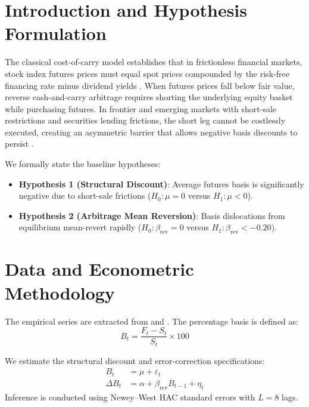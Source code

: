 \documentclass{article}
\begin{document}
\section{Introduction and Hypothesis Formulation}
\label{sec:intro}

The classical cost-of-carry model establishes that in frictionless financial markets, stock index futures prices must equal spot prices compounded by the risk-free financing rate minus dividend yields \citep{brenner1989behavior, chan1992further}. When futures prices fall below fair value, reverse cash-and-carry arbitrage requires shorting the underlying equity basket while purchasing futures. In frontier and emerging markets with short-sale restrictions and securities lending frictions, the short leg cannot be costlessly executed, creating an asymmetric barrier that allows negative basis discounts to persist \citep{shleifer1997limits}.

We formally state the baseline hypotheses:
\begin{itemize}
    \item \textbf{Hypothesis 1 (Structural Discount)}: Average futures basis is significantly negative due to short-sale frictions ($H_0: \mu = 0$ versus $H_1: \mu < 0$).
    \item \textbf{Hypothesis 2 (Arbitrage Mean Reversion)}: Basis dislocations from equilibrium mean-revert rapidly ($H_0: \beta_{\text{rev}} = 0$ versus $H_1: \beta_{\text{rev}} < -0.20$).
\end{itemize}

\section{Data and Econometric Methodology}
\label{sec:data}

The empirical series are extracted from  and . The percentage basis is defined as:
\begin{equation}
    B_t = \frac{F_t - S_t}{S_t} \times 100
\end{equation}

We estimate the structural discount and error-correction specifications:
\begin{align}
    B_t &= \mu + \varepsilon_t \\
    \Delta B_t &= \alpha + \beta_{\text{rev}} B_{t-1} + \eta_t
\end{align}
Inference is conducted using Newey--West HAC standard errors \citep{newey1987simple} with $L = 8$ lags.
\end{document}

